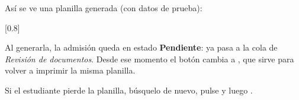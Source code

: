 Así se ve una planilla generada (con datos de prueba):

[0.8\linewidth]

Al generarla, la admisión queda en estado \textbf{Pendiente}: ya pasa a la cola de
\emph{Revisión de documentos}. Desde ese momento el botón cambia a , que
sirve para volver a imprimir la misma planilla.

\begin{consejo}
Si el estudiante pierde la planilla, búsquelo de nuevo, pulse  y luego
.
\end{consejo}
